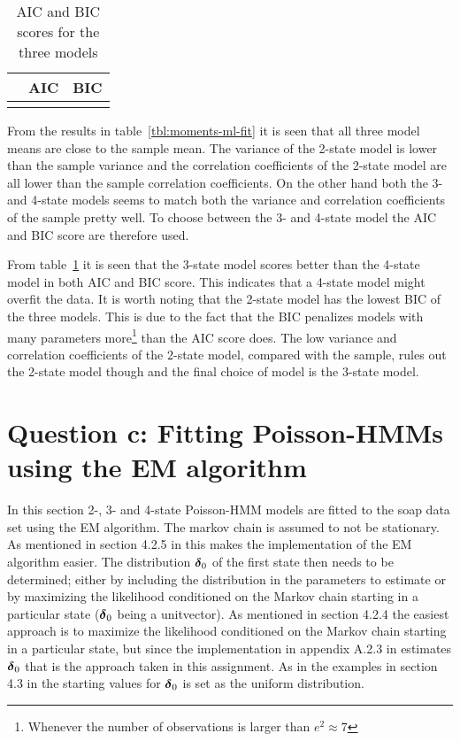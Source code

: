 \begin{table}[ht]
    \centering
    \begin{tabular}{ccc}
        \hline
         & AIC & BIC \\\hline
        }
    \end{tabular}
    \caption{AIC and BIC scores for the three models}
    \label{tbl:aic-bic-ml-fit}
\end{table}

From the results in table~\ref{tbl:moments-ml-fit} it is seen that all three model means are close to the sample mean. The variance of the 2-state model is lower than the sample variance and the correlation coefficients of the 2-state model are all lower than the sample correlation coefficients. On the other hand both the 3- and 4-state models seems to match both the variance and correlation coefficients of the sample pretty well. To choose between the 3- and 4-state model the AIC and BIC score are therefore used.

From table~\ref{tbl:aic-bic-ml-fit} it is seen that the 3-state model scores better than the 4-state model in both AIC and BIC score. This indicates that a 4-state model might overfit the data. It is worth noting that the 2-state model has the lowest BIC of the three models. This is due to the fact that the BIC penalizes models with many parameters more\footnote{Whenever the number of observations is larger than $e^2\approx 7$} than the AIC score does. The low variance and correlation coefficients of the 2-state model, compared with the sample, rules out the 2-state model though and the final choice of model is the 3-state model.


\section*{Question c: Fitting Poisson-HMMs using the EM algorithm}

In this section 2-, 3- and 4-state Poisson-HMM models are fitted to the soap data set using the EM algorithm. The markov chain is assumed to not be stationary. As mentioned in section 4.2.5 in \cite{zucchini09} this makes the implementation of the EM algorithm easier. The distribution $\boldsymbol{\delta}_0$ of the first state then needs to be determined; either by including the distribution in the parameters to estimate or by maximizing the likelihood conditioned on the Markov chain starting in a particular state ($\boldsymbol{\delta}_0$ being a unitvector). As mentioned in section 4.2.4 the easiest approach is to maximize the likelihood conditioned on the Markov chain starting in a particular state, but since the implementation in appendix A.2.3 in \cite{zucchini09} estimates $\boldsymbol{\delta}_0$ that is the approach taken in this assignment. As in the examples in section 4.3 in \cite{zucchini09} the starting values for $\boldsymbol{\delta}_0$ is set as the uniform distribution.


